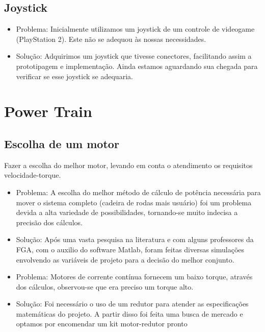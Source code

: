 \subsection{Joystick}
 \begin{itemize}
  \item Problema: Inicialmente utilizamos um joystick de um controle de videogame (PlayStation 2). Este não se adequou às nossas necessidades.
  \item Solução: Adquirimos um joystick que tivesse conectores, facilitando assim a prototipagem e implementação. Ainda estamos aguardando sua chegada para verificar se esse joystick se adequaria.

 \end{itemize}

\section{Power Train}

\subsection{Escolha de um motor}
  Fazer a escolha do melhor motor, levando em conta o atendimento os requisitos velocidade-torque.
 \begin{itemize}
  \item Problema: A escolha do melhor método de cálculo de potência necessária para mover o sistema completo (cadeira de rodas mais usuário) foi um problema devida a alta variedade de possibilidades, tornando-se muito indecisa a precisão dos cálculos.
  \item Solução: Após uma vasta pesquisa na literatura e com alguns professores da FGA, com o auxilio do software Matlab, foram feitas diversas simulações envolvendo as variáveis de projeto para a decisão do melhor conjunto.

  \item Problema: Motores de corrente contínua fornecem um baixo torque, através dos cálculos, observou-se que era preciso um torque alto.
  \item Solução: Foi necessário o uso de um redutor para atender as especificações matemáticas do projeto. A partir disso foi feita uma busca de mercado e optamos por encomendar um kit motor-redutor pronto

 \end{itemize}

